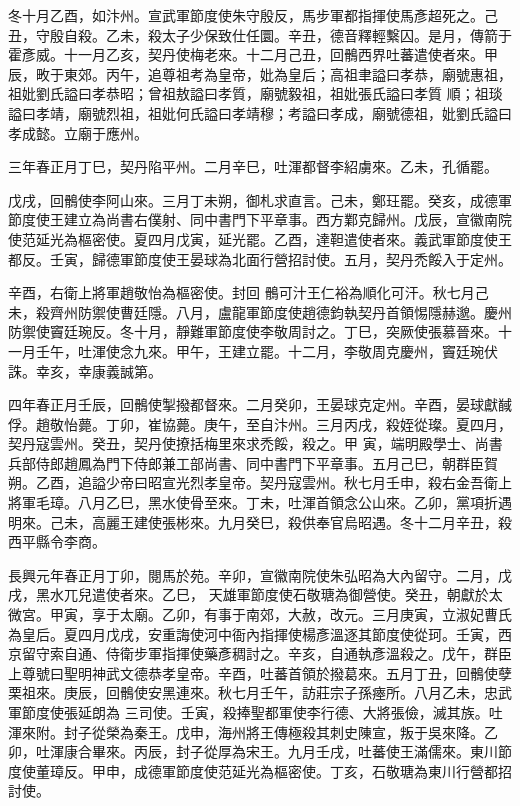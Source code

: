 \begin{pinyinscope}
 冬十月乙酉，如汴州。宣武軍節度使朱守殷反，馬步軍都指揮使馬彥超死之。己丑，守殷自殺。乙未，殺太子少保致仕任圜。辛丑，德音釋輕繫囚。是月，傳箭于霍彥威。十一月乙亥，契丹使梅老來。十二月己丑，回鶻西界吐蕃遣使者來。甲辰，畋于東郊。丙午，追尊祖考為皇帝，妣為皇后；高祖聿謚曰孝恭，廟號惠祖，祖妣劉氏謚曰孝恭昭；曾祖敖謚曰孝質，廟號毅祖，祖妣張氏謚曰孝質
 順；祖琰謚曰孝靖，廟號烈祖，祖妣何氏謚曰孝靖穆；考謚曰孝成，廟號德祖，妣劉氏謚曰孝成懿。立廟于應州。



 三年春正月丁巳，契丹陷平州。二月辛巳，吐渾都督李紹虜來。乙未，孔循罷。



 戊戌，回鶻使李阿山來。三月丁未朔，御札求直言。己未，鄭玨罷。癸亥，成德軍節度使王建立為尚書右僕射、同中書門下平章事。西方鄴克歸州。戊辰，宣徽南院使范延光為樞密使。夏四月戊寅，延光罷。乙酉，達靼遣使者來。義武軍節度使王都反。壬寅，歸德軍節度使王晏球為北面行營招討使。五月，契丹禿餒入于定州。



 辛酉，右衛上將軍趙敬怡為樞密使。封回
 鶻可汁王仁裕為順化可汗。秋七月己未，殺齊州防禦使曹廷隱。八月，盧龍軍節度使趙德鈞執契丹首領惕隱赫邈。慶州防禦使竇廷琬反。冬十月，靜難軍節度使李敬周討之。丁巳，突厥使張慕晉來。十一月壬午，吐渾使念九來。甲午，王建立罷。十二月，李敬周克慶州，竇廷琬伏誅。幸亥，幸康義誠第。



 四年春正月壬辰，回鶻使掣撥都督來。二月癸卯，王晏球克定州。辛酉，晏球獻馘俘。趙敬怡薨。丁卯，崔協薨。庚午，至自汴州。三月丙戌，殺姪從璨。夏四月，契丹寇雲州。癸丑，契丹使撩括梅里來求禿餒，殺之。甲
 寅，端明殿學士、尚書兵部侍郎趙鳳為門下侍郎兼工部尚書、同中書門下平章事。五月己巳，朝群臣賀朔。乙酉，追謚少帝曰昭宣光烈孝皇帝。契丹寇雲州。秋七月壬申，殺右金吾衛上將軍毛璋。八月乙巳，黑水使骨至來。丁未，吐渾首領念公山來。乙卯，黨項折遇明來。己未，高麗王建使張彬來。九月癸巳，殺供奉官烏昭遇。冬十二月辛丑，殺西平縣令李商。



 長興元年春正月丁卯，閱馬於苑。辛卯，宣徽南院使朱弘昭為大內留守。二月，戊戌，黑水兀兒遣使者來。乙巳，
 天雄軍節度使石敬瑭為御營使。癸丑，朝獻於太微宮。甲寅，享于太廟。乙卯，有事于南郊，大赦，改元。三月庚寅，立淑妃曹氏為皇后。夏四月戊戌，安重誨使河中衙內指揮使楊彥溫逐其節度使從珂。壬寅，西京留守索自通、侍衛步軍指揮使藥彥稠討之。辛亥，自通執彥溫殺之。戊午，群臣上尊號曰聖明神武文德恭孝皇帝。辛酉，吐蕃首領於撥葛來。五月丁丑，回鶻使孽栗祖來。庚辰，回鶻使安黑連來。秋七月壬午，訪莊宗子孫瘞所。八月乙未，忠武軍節度使張延朗為
 三司使。壬寅，殺捧聖都軍使李行德、大將張儉，滅其族。吐渾來附。封子從榮為秦王。戊申，海州將王傳極殺其刺史陳宣，叛于吳來降。乙卯，吐渾康合畢來。丙辰，封子從厚為宋王。九月壬戌，吐蕃使王滿儒來。東川節度使董璋反。甲申，成德軍節度使范延光為樞密使。丁亥，石敬瑭為東川行營都招討使。




\end{pinyinscope}
